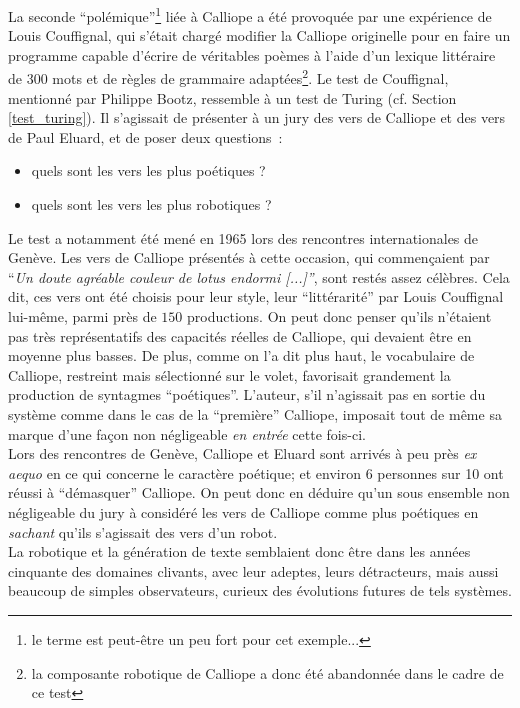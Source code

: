 \documentclass{article}
\begin{document}
					La seconde ``polémique''\footnote{le terme est peut-être un peu fort pour cet exemple...} liée à Calliope a été provoquée par une expérience de Louis Couffignal, qui s'était chargé modifier la Calliope originelle pour en faire un programme capable d'écrire de véritables poèmes à l'aide d'un lexique littéraire de $300$ mots et de règles de grammaire adaptées\footnote{la composante robotique de Calliope a donc été abandonnée dans le cadre de ce test}. Le test de Couffignal, mentionné par Philippe Bootz, ressemble à un test de Turing (cf. Section \ref{test_turing}). Il s'agissait de présenter à un jury des vers de Calliope et des vers de Paul Eluard, et de poser deux questions~:
					\vspace{2mm}
					\begin{itemize}
						\item quels sont les vers les plus poétiques ?
						\item  quels sont les vers les plus robotiques ?
					\end{itemize}
					\vspace{2mm}
					Le test a notamment été mené en 1965 lors des rencontres internationales de Genève. Les vers de Calliope présentés à cette occasion, qui commençaient par ``\textit{Un doute agréable couleur de lotus endormi [...]''}, sont restés assez célèbres. Cela dit, ces vers ont été choisis pour leur style, leur ``littérarité'' par Louis Couffignal lui-même, parmi près de $150$ productions. On peut donc penser qu'ils n'étaient pas très représentatifs des capacités réelles de Calliope, qui devaient être en moyenne plus basses. De plus, comme on l'a dit plus haut, le vocabulaire de Calliope, restreint mais sélectionné sur le volet, favorisait grandement la production de syntagmes ``poétiques''. L'auteur, s'il n'agissait pas en sortie du système comme dans le cas de la ``première'' Calliope, imposait tout de même sa marque d'une façon non négligeable \textit{en entrée} cette fois-ci.\\
					
					Lors des rencontres de Genève, Calliope et Eluard sont arrivés à peu près \textit{ex aequo} en ce qui concerne le caractère poétique; et environ 6 personnes sur 10 ont réussi à ``démasquer'' Calliope. On peut donc en déduire qu'un sous ensemble non négligeable du jury à considéré les vers de Calliope comme plus poétiques en \textit{sachant} qu'ils s'agissait des vers d'un robot.\\
					
					La robotique et la génération de texte semblaient donc être dans les années cinquante des domaines clivants, avec leur adeptes, leurs détracteurs, mais aussi beaucoup de simples observateurs, curieux des évolutions futures de tels systèmes.
\end{document}
